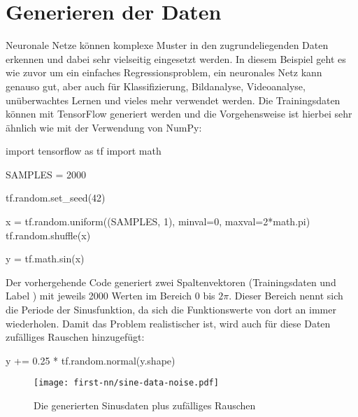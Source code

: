 \section{Generieren der Daten}
Neuronale Netze können komplexe Muster in den zugrundeliegenden Daten erkennen
und dabei sehr vielseitig eingesetzt werden.
In diesem Beispiel geht es wie zuvor um ein einfaches Regressionsproblem,
ein neuronales Netz kann genauso gut, aber auch für
Klassifizierung, Bildanalyse, Videoanalyse, unüberwachtes Lernen und vieles mehr verwendet werden.
Die Trainingsdaten können mit TensorFlow generiert werden und
die Vorgehensweise ist hierbei sehr ähnlich wie mit der Verwendung von NumPy:
\begin{pythoncode}
import tensorflow as tf
import math

SAMPLES = 2000

tf.random.set_seed(42)

x = tf.random.uniform((SAMPLES, 1), minval=0, maxval=2*math.pi)
tf.random.shuffle(x)

y = tf.math.sin(x)
\end{pythoncode}
Der vorhergehende Code generiert zwei Spaltenvektoren
(Trainingsdaten  und Label )
mit jeweils 2000 Werten im Bereich 0 bis $2\pi$.
Dieser Bereich nennt sich die Periode der Sinusfunktion,
da sich die Funktionswerte von dort an immer wiederholen.
Damit das Problem realistischer ist, wird auch für diese Daten
zufälliges Rauschen hinzugefügt:
\begin{pythoncode}
y += 0.25 * tf.random.normal(y.shape)
\end{pythoncode}
\begin{figure}[h!]
  \centering
  \texttt{[image: first-nn/sine-data-noise.pdf]}
  \caption{Die generierten Sinusdaten plus zufälliges Rauschen}
\end{figure}

